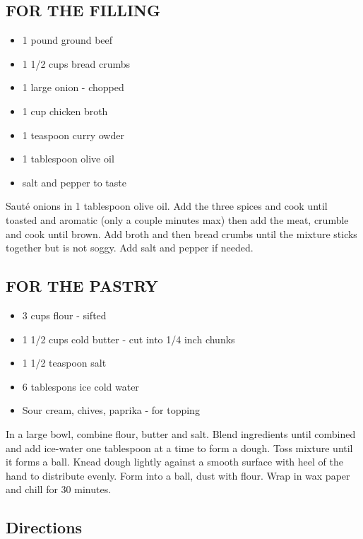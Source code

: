 \documentclass[
]{book}
\providecommand{\tightlist}{%
  \setlength{\itemsep}{0pt}\setlength{\parskip}{0pt}}
\begin{document}
\hypertarget{for-the-filling}{%
\subsection*{FOR THE FILLING}\label{for-the-filling}}


\begin{itemize}
\tightlist
\item
  1 pound ground beef
\item
  1 1/2 cups bread crumbs
\item
  1 large onion - chopped
\item
  1 cup chicken broth
\item
  1 teaspoon curry owder
\item
  1 tablespoon olive oil
\item
  salt and pepper to taste
\end{itemize}

Sauté onions in 1 tablespoon olive oil. Add the three spices and cook until toasted and aromatic (only a couple minutes max) then add the meat, crumble and cook until brown. Add broth and then bread crumbs until the mixture sticks together but is not soggy. Add salt and pepper if needed.

\hypertarget{for-the-pastry}{%
\subsection*{FOR THE PASTRY}\label{for-the-pastry}}


\begin{itemize}
\tightlist
\item
  3 cups flour - sifted
\item
  1 1/2 cups cold butter - cut into 1/4 inch chunks
\item
  1 1/2 teaspoon salt
\item
  6 tablespons ice cold water
\item
  Sour cream, chives, paprika - for topping
\end{itemize}

In a large bowl, combine flour, butter and salt. Blend ingredients until combined and add ice-water one tablespoon at a time to form a dough. Toss mixture until it forms a ball. Knead dough lightly against a smooth surface with heel of the hand to distribute evenly. Form into a ball, dust with flour. Wrap in wax paper and chill for 30 minutes.

\hypertarget{directions-53}{%
\subsection*{Directions}\label{directions-53}}
\end{document}
